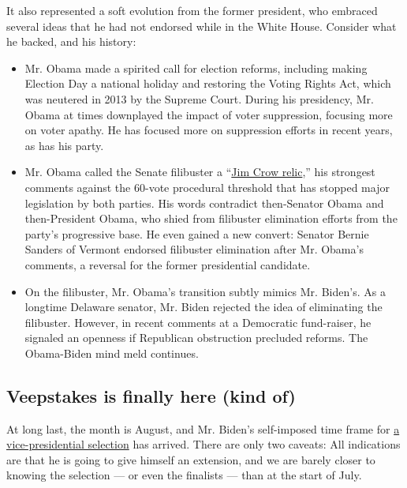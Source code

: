 It also represented a soft evolution from the former president, who
embraced several ideas that he had not endorsed while in the White
House. Consider what he backed, and his history:

\begin{itemize}
\item
  Mr. Obama made a spirited call for election reforms, including making
  Election Day a national holiday and restoring the Voting Rights Act,
  which was neutered in 2013 by the Supreme Court. During his
  presidency, Mr. Obama at times downplayed the impact of voter
  suppression, focusing more on voter apathy. He has focused more on
  suppression efforts in recent years, as has his party.
\item
  Mr. Obama called the Senate filibuster a
  ``\href{https://www.nytimes3xbfgragh.onion/2020/07/30/us/obama-filibuster-senate-democrats.html}{Jim
  Crow relic},'' his strongest comments against the 60-vote procedural
  threshold that has stopped major legislation by both parties. His
  words contradict then-Senator Obama and then-President Obama, who
  shied from filibuster elimination efforts from the party's progressive
  base. He even gained a new convert: Senator Bernie Sanders of Vermont
  endorsed filibuster elimination after Mr. Obama's comments, a reversal
  for the former presidential candidate.
\item
  On the filibuster, Mr. Obama's transition subtly mimics Mr. Biden's.
  As a longtime Delaware senator, Mr. Biden rejected the idea of
  eliminating the filibuster. However, in recent comments at a
  Democratic fund-raiser, he signaled an openness if Republican
  obstruction precluded reforms. The Obama-Biden mind meld continues.
\end{itemize}

\hypertarget{veepstakes-is-finally-here-kind-of}{%
\subsection{Veepstakes is finally here (kind
of)}\label{veepstakes-is-finally-here-kind-of}}

At long last, the month is August, and Mr. Biden's self-imposed time
frame for
\href{https://www.nytimes3xbfgragh.onion/article/biden-vice-president-2020.html}{a
vice-presidential selection} has arrived. There are only two caveats:
All indications are that he is going to give himself an extension, and
we are barely closer to knowing the selection --- or even the finalists
--- than at the start of July.

